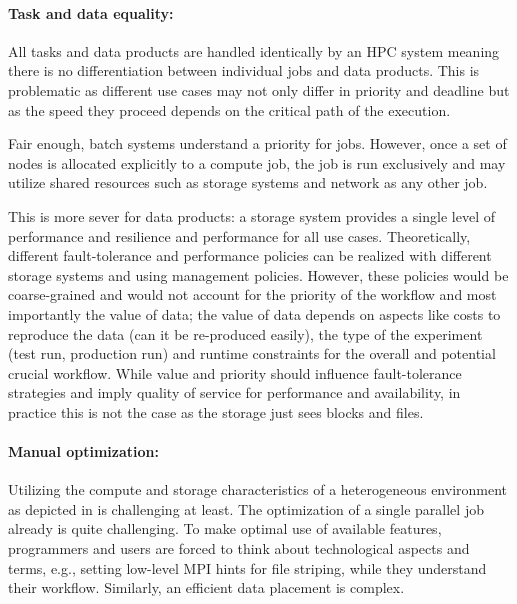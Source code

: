 \documentclass[a4paper, twocolumn]{article}
\begin{document}
\paragraph{Task and data equality:}

All tasks and data products are handled identically by an HPC system meaning there is no differentiation between individual jobs and data products.
This is problematic as different use cases may not only differ in priority and deadline but as the speed they proceed depends on the critical path of the execution.

Fair enough, batch systems understand a priority for jobs.
However, once a set of nodes is allocated explicitly to a compute job, the job is run exclusively and may utilize shared resources such as storage systems and network as any other job. %

This is more sever for data products: a storage system provides a single level of performance and resilience and performance for all use cases.
Theoretically, different fault-tolerance and performance policies can be realized with different storage systems and using management policies.
However, these policies would be coarse-grained and would not account for the priority of the workflow and most importantly the value of data;
the value of data depends on aspects like costs to reproduce the data (can it be re-produced easily), the type of the experiment (test run, production run) and runtime constraints for the overall and potential crucial workflow.
While value and priority should influence fault-tolerance strategies and imply quality of service for performance and availability, in practice this is not the case as the storage just sees blocks and files.

\paragraph{Manual optimization:}
Utilizing the compute and storage characteristics of a heterogeneous environment as depicted in  is challenging at least.
The optimization of a single parallel job already is quite challenging.
To make optimal use of available features, programmers and users are forced to think about technological aspects and terms, e.g., setting low-level MPI hints for file striping, while they understand their workflow.
Similarly, an efficient data placement is complex.

\medskip
\end{document}
